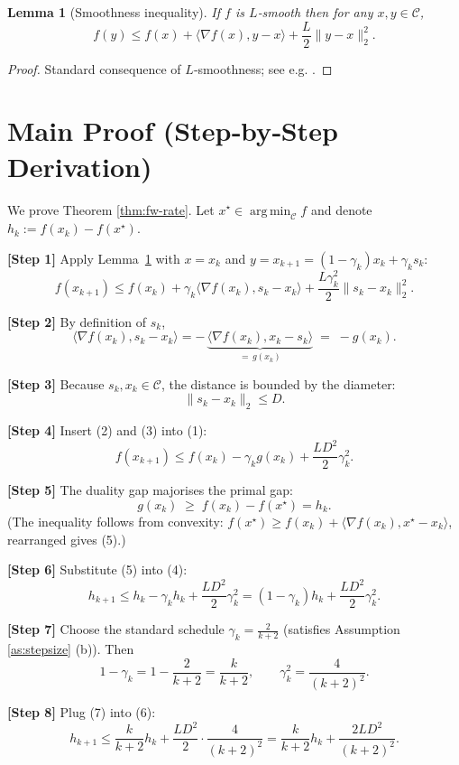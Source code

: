 \documentclass{article}
\newtheorem{lemma}{Lemma}
\newcommand{\argmin}{\operatorname*{arg\,min}}
\begin{document}
\begin{lemma}[Smoothness inequality]\label{lem:smooth}
If $f$ is $L$‑smooth then for any $x,y\in\mathcal C$,
\[
f(y) \le f(x) + \langle \nabla f(x),y-x\rangle + \frac{L}{2}\|y-x\|_2^2 .
\]
\end{lemma}
\begin{proof}
Standard consequence of $L$‑smoothness; see e.g. \cite{nesterov2004intro}.
\end{proof}

\section*{Main Proof (Step‑by‑Step Derivation)}
We prove Theorem \ref{thm:fw-rate}.  
Let $x^\star\in\argmin_{\mathcal C}f$ and denote $h_k:=f(x_k)-f(x^\star)$.  

\noindent\textbf{[Step 1]} Apply Lemma~\ref{lem:smooth} with $x=x_k$ and $y=x_{k+1}=(1-\gamma_k)x_k+\gamma_k s_k$:
\[
f(x_{k+1}) \le f(x_k)+\gamma_k\langle\nabla f(x_k),s_k-x_k\rangle+\frac{L\gamma_k^{2}}{2}\|s_k-x_k\|_2^{2}. \tag{1}
\]

\noindent\textbf{[Step 2]} By definition of $s_k$,
\[
\langle\nabla f(x_k),s_k-x_k\rangle
    = -\,\underbrace{\langle\nabla f(x_k),x_k-s_k\rangle}_{=\,g(x_k)}\;=\; -g(x_k). \tag{2}
\]

\noindent\textbf{[Step 3]} Because $s_k,x_k\in\mathcal C$, the distance is bounded by the diameter:
\[
\|s_k-x_k\|_2 \le D . \tag{3}
\]

\noindent\textbf{[Step 4]} Insert (2) and (3) into (1):
\[
f(x_{k+1}) \le f(x_k)-\gamma_k g(x_k)+\frac{L D^{2}}{2}\gamma_k^{2}. \tag{4}
\]

\noindent\textbf{[Step 5]} The duality gap majorises the primal gap:
\[
g(x_k)\;\ge\; f(x_k)-f(x^\star)=h_k . \tag{5}
\]
(The inequality follows from convexity:
$f(x^\star)\ge f(x_k)+\langle\nabla f(x_k),x^\star-x_k\rangle$,
rearranged gives (5).)

\noindent\textbf{[Step 6]} Substitute (5) into (4):
\[
h_{k+1}\le h_k-\gamma_k h_k+\frac{L D^{2}}{2}\gamma_k^{2}
          = (1-\gamma_k)h_k+\frac{L D^{2}}{2}\gamma_k^{2}. \tag{6}
\]

\noindent\textbf{[Step 7]} Choose the standard schedule $\displaystyle\gamma_k=\frac{2}{k+2}$ (satisfies Assumption \ref{as:stepsize} (b)). Then
\[
1-\gamma_k = 1-\frac{2}{k+2}= \frac{k}{k+2},\qquad
\gamma_k^{2}= \frac{4}{(k+2)^{2}} . \tag{7}
\]

\noindent\textbf{[Step 8]} Plug (7) into (6):
\[
h_{k+1}\le \frac{k}{k+2}h_k+\frac{L D^{2}}{2}\cdot\frac{4}{(k+2)^{2}}
        = \frac{k}{k+2}h_k+\frac{2L D^{2}}{(k+2)^{2}} . \tag{8}
\]
\end{document}
